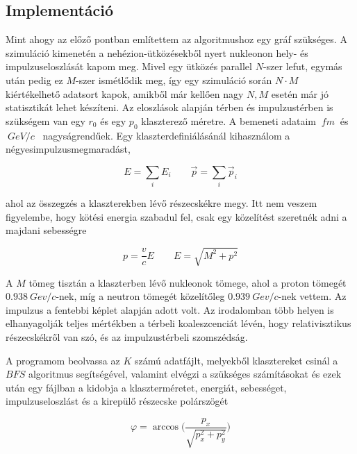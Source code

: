 \documentclass[a4paper,12pt]{article}
\begin{document}
\subsection{ Implementáció}

\par Mint ahogy az előző pontban említettem az algoritmushoz egy gráf szükséges. A szimuláció kimenetén a nehézion-ütközésekből nyert nukleonon hely- és impulzuseloszlását kapom meg. Mivel egy ütközés parallel $N$-szer lefut, egymás után pedig ez $M$-szer ismétlődik meg, így egy szimuláció során $N\cdot M$ kiértékelhető adatsort kapok, amikből már kellően nagy $N, M$ esetén már jó statisztikát lehet készíteni. Az eloszlások alapján térben és impulzustérben is szükségem van egy $r_{0}$ és egy $p_{0}$ klaszterező méretre. A bemeneti adataim $~fm~$ és $~GeV/c$~ nagyságrendűek. Egy klaszterdefiniálásánál kihasználom a négyesimpulzusmegmaradást, 

\begin{equation*}
	E = \sum_{i} E_{i} \quad \quad \vec{p} = \sum_{i} \vec{p}_{i}
\end{equation*} 

\par ahol az összegzés a klaszterekben lévő részecskékre megy. Itt nem veszem figyelembe, hogy kötési energia szabadul fel, csak egy közelítést szeretnék adni a majdani sebességre

\begin{equation*}
	p = \frac{v}{c} E \quad \quad E = \sqrt{M^{2} + p^{2}}
\end{equation*}

\par A $M$ tömeg tisztán a klaszterben lévő nukleonok tömege, ahol a proton tömegét $0.938 ~Gev/c$-nek, míg a neutron tömegét közelítőleg $0.939 ~Gev/c$-nek vettem. Az impulzus a fentebbi képlet alapján adott volt. Az irodalomban több helyen is elhanyagolják teljes mértékben a térbeli koaleszcenciát lévén, hogy relativisztikus részecskékről van szó, és az impulzustérbeli szomszédság. 

\par A programom beolvassa az $K$ számú adatfájlt, melyekből klasztereket csinál a $BFS$ algoritmus segítségével, valamint elvégzi a szükséges számításokat és ezek után egy fájlban a kidobja a klaszterméretet, energiát, sebességet, impulzuseloszlást és a kirepülő részecske polárszögét

\begin{equation*}
\varphi = \arccos\Big(\frac{p_{x}}{\sqrt{p_{x}^{2} + p_{y}^{2}}}\Big)
\end{equation*}
\end{document}
